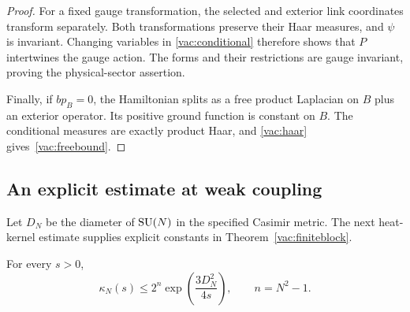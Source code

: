 \begin{proof}
For a fixed gauge transformation, the selected and exterior link coordinates
transform separately.  Both transformations preserve their Haar measures,
and $\psi$ is invariant.  Changing variables in
\eqref{vac:conditional} therefore shows that $P$ intertwines the gauge
action.  The forms and their restrictions are gauge invariant, proving the
physical-sector assertion.

Finally, if $bp_B=0$, the Hamiltonian splits as a free product Laplacian on
$B$ plus an exterior operator.  Its positive ground function is constant on
$B$.  The conditional measures are exactly product Haar, and
\eqref{vac:haar} gives~\eqref{vac:freebound}.
\end{proof}

\subsection{An explicit estimate at weak coupling}
\label{vac:explicit}

Let $D_N$ be the diameter of $\operatorname{SU}(N)$ in the specified Casimir metric.
The next heat-kernel estimate supplies explicit constants in
Theorem~\ref{vac:finiteblock}.

\begin{lemma}
\label{vac:heatlemma}
For every $s>0$,
\begin{equation}
 \kappa_N(s)\leq 2^n
       \exp\!\left(\frac{3D_N^2}{4s}\right),
 \qquad n=N^2-1.
 \label{vac:kappabound}
\end{equation}
\end{lemma}

